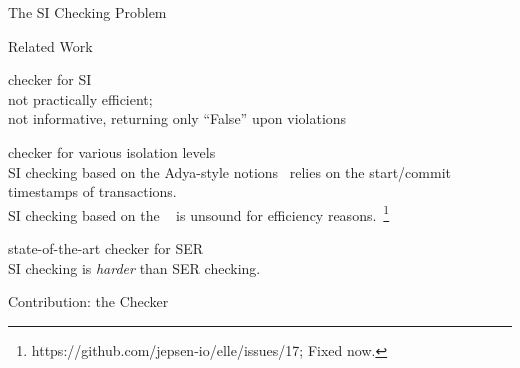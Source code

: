\begin{frame}{The SI Checking Problem}
  \begin{center}
    

    \vspace{0.30cm}
  \end{center}
\end{frame}

\begin{frame}{Related Work}
  \begin{description}
    \setlength{\itemsep}{15pt}
    \item[dbcop~\ncite{Complexity:OOPSLA2019}] checker for SI \\[2pt]
      not practically efficient; \\[2pt]
      not informative, returning only ``\textsf{False}'' upon violations
    \pause
    \item[Elle~\ncite{Elle:VLDB2020}] checker for various isolation levels \\[2pt]
      \pause
      SI checking based on the Adya-style notions~
      relies on the start/commit timestamps of transactions.\\[2pt]
      \pause
      SI checking based on the ~
      is unsound for efficiency reasons.~\footnote{https://github.com/jepsen-io/elle/issues/17; Fixed now.}
    \pause
    \item[Cobra~\ncite{Cobra:OSDI2020}] state-of-the-art checker for SER \\[2pt]
      SI checking is {\it harder} than SER checking.
  \end{description}
\end{frame}

\begin{frame}{Contribution: the \polysi{} Checker}
\end{frame}


